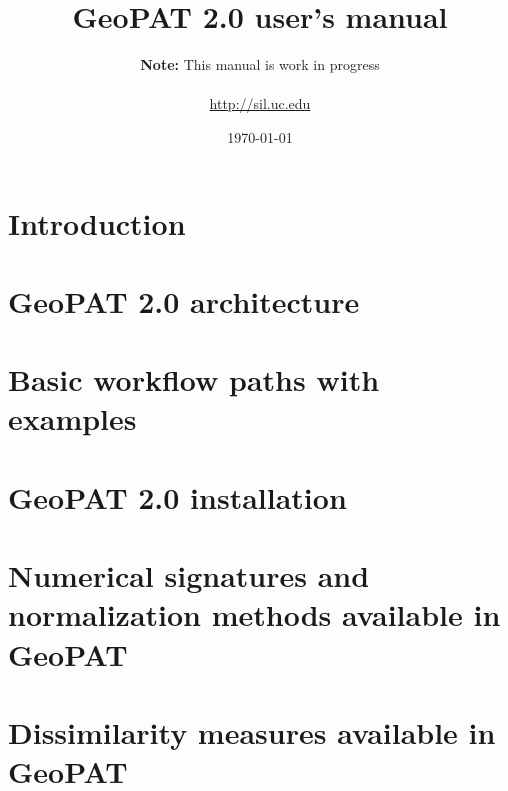 \documentclass[12pt,margin=0.5in]{article}
\title{GeoPAT 2.0 user's manual}
\author{{\bf Note:} This manual is work in progress \\ \\ \url{http://sil.uc.edu}}
\date{\today}
\begin{document}
\maketitle
\newpage

\tableofcontents
\newpage

\section{Introduction}


\section{GeoPAT 2.0 architecture}


\section{Basic workflow paths with examples}


\FloatBarrier

\begin{appendices}

\section{GeoPAT 2.0 installation}


\section{Numerical signatures and normalization methods available in GeoPAT} \label{signatures}


\section{Dissimilarity measures available in GeoPAT}


\end{appendices}



\end{document}
